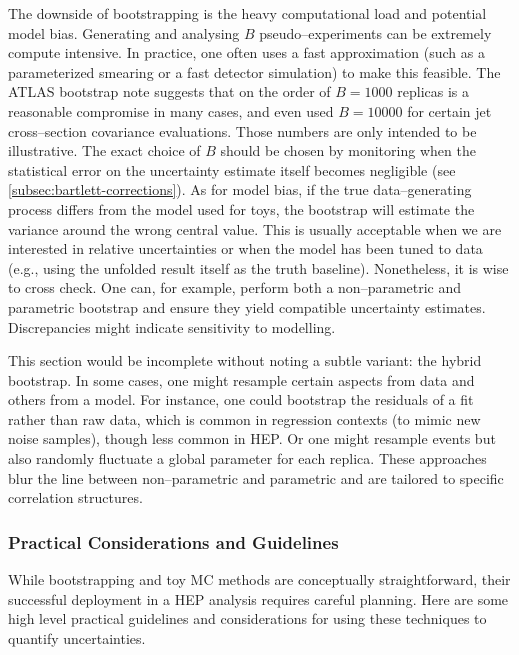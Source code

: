         The downside of bootstrapping is the heavy computational load and potential model bias.
        Generating and analysing $B$ pseudo--experiments can be extremely compute intensive.
        In practice, one often uses a fast approximation (such as a parameterized smearing or a fast detector simulation) to make this feasible.
        The ATLAS bootstrap note suggests that on the order of $B=1000$ replicas is a reasonable compromise in many cases, and even used $B=10000$ for certain jet cross--section covariance evaluations.
        Those numbers are only intended to be illustrative.
        The exact choice of $B$ should be chosen by monitoring when the statistical error on the uncertainty estimate itself becomes negligible (see \cref{subsec:bartlett-corrections}).
        As for model bias, if the true data--generating process differs from the model used for toys, the bootstrap will estimate the variance around the wrong central value.
        This is usually acceptable when we are interested in relative uncertainties or when the model has been tuned to data (e.g., using the unfolded result itself as the truth baseline).
        Nonetheless, it is wise to cross check.
        One can, for example, perform both a non--parametric and parametric bootstrap and ensure they yield compatible uncertainty estimates.
        Discrepancies might indicate sensitivity to modelling.

        This section would be incomplete without noting a subtle variant: the hybrid bootstrap.
        In some cases, one might resample certain aspects from data and others from a model.
        For instance, one could bootstrap the residuals of a fit rather than raw data, which is common in regression contexts (to mimic new noise samples), though less common in HEP.
        Or one might resample events but also randomly fluctuate a global parameter for each replica.
        These approaches blur the line between non--parametric and parametric and are tailored to specific correlation structures.

    \subsubsection{Practical Considerations and Guidelines}
        While bootstrapping and toy MC methods are conceptually straightforward, their successful deployment in a HEP analysis requires careful planning.
        Here are some high level practical guidelines and considerations for using these techniques to quantify uncertainties.
